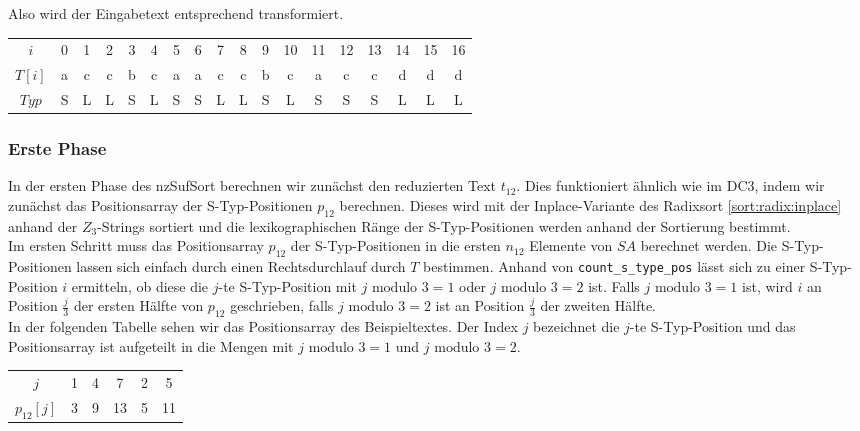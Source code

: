 Also wird der Eingabetext entsprechend transformiert.

\begin{table}[H]
	\centering
	\begin{tabular}{c| c c c c c c c c c c c c c c c c c}
		$i$ & 0 & 1 & 2 & 3 & 4 & 5 & 6 & 7 & 8 & 9 & 10 & 11 & 12 & 13 & 14 & 15 & 16 \\
		$T[i]$ & a & c & c & b & c & a & a & c & c & b & c & a & c & c & d & d & d \\
		$Typ$ & S & L & L & S & L & S & S & L & L & S & L & S & S & S & L & L & L
	\end{tabular}
\end{table}

\subsubsection{Erste Phase}

In der ersten Phase des nzSufSort berechnen wir zunächst den reduzierten Text $t_{12}$. Dies funktioniert ähnlich wie im DC3, indem wir zunächst das Positionsarray der S-Typ-Positionen $p_{12}$ berechnen. Dieses wird mit der Inplace-Variante des Radixsort \cref{sort:radix:inplace} anhand der $Z_3$-Strings sortiert und die lexikographischen Ränge der S-Typ-Positionen werden anhand der Sortierung bestimmt. \\

Im ersten Schritt muss das Positionsarray $p_{12}$ der S-Typ-Positionen in die ersten $n_{12}$ Elemente von $SA$ berechnet werden. Die S-Typ-Positionen lassen sich einfach durch einen Rechtsdurchlauf durch $T$ bestimmen. Anhand von  \texttt{count\_s\_type\_pos} lässt sich zu einer S-Typ-Position $i$ ermitteln, ob diese die $j$-te S-Typ-Position mit $j \text{ modulo } 3 = 1$ oder $j \text{ modulo } 3 = 2$ ist. Falls $j \text{ modulo } 3 = 1$ ist, wird $i$ an Position $\frac{j}{3}$ der ersten Hälfte von $p_{12}$ geschrieben, falls $j \text{ modulo } 3 = 2$ ist an Position $\frac{j}{3}$ der zweiten Hälfte. \\
In der folgenden Tabelle sehen wir das Positionsarray des Beispieltextes. Der Index $j$ bezeichnet die $j$-te S-Typ-Position und das Positionsarray ist aufgeteilt in die Mengen mit $j \text{ modulo } 3 = 1$ und $j \text{ modulo } 3 = 2$.

\begin{table}[H]
	\centering
	\begin{tabular}{c| c c c || c c }
		$j$ & 1 & 4 & 7 & 2 & 5 \\
		$p_{12}[j]$ & 3 & 9 & 13 & 5 & 11 
	\end{tabular}
\end{table}

